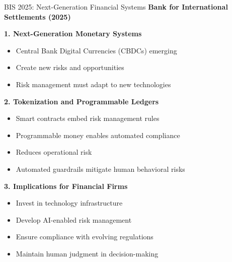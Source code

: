 \documentclass[aspectratio=169,10pt]{beamer}
\renewcommand{\small}{\fontsize{7pt}{8.5pt}\selectfont}
\renewcommand{\large}{\fontsize{9pt}{11pt}\selectfont}
\newcommand{\question}[1]{{\large\bfseries\color{crimson}#1}}
\begin{document}
	\begin{frame}{BIS 2025: Next-Generation Financial Systems}
		\question{Bank for International Settlements (2025)}
		\small
		
		\textbf{1. Next-Generation Monetary Systems}
		\begin{itemize}
			\item Central Bank Digital Currencies (CBDCs) emerging
			\item Create new risks and opportunities
			\item Risk management must adapt to new technologies
		\end{itemize}
		
		\vspace{0.1cm}
		\textbf{2. Tokenization and Programmable Ledgers}
		\begin{itemize}
			\item Smart contracts embed risk management rules
			\item Programmable money enables automated compliance
			\item Reduces operational risk
			\item Automated guardrails mitigate human behavioral risks
		\end{itemize}
		
		\vspace{0.1cm}
		\textbf{3. Implications for Financial Firms}
		\begin{itemize}
			\item Invest in technology infrastructure
			\item Develop AI-enabled risk management
			\item Ensure compliance with evolving regulations
			\item Maintain human judgment in decision-making
		\end{itemize}
	\end{frame}
	
	
\end{document}
